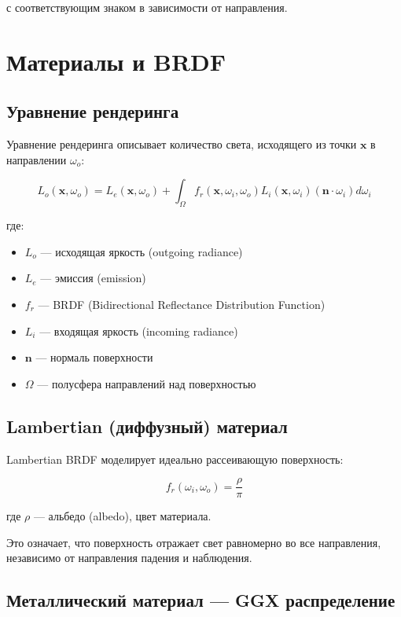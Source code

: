 \documentclass[14pt, a4paper]{extarticle}
\begin{document}
с соответствующим знаком в зависимости от направления.

\section{Материалы и BRDF}

\subsection{Уравнение рендеринга}

Уравнение рендеринга описывает количество света, исходящего из точки $\mathbf{x}$ в направлении $\omega_o$:

\[
L_o(\mathbf{x}, \omega_o) = L_e(\mathbf{x}, \omega_o) + \int_{\Omega} f_r(\mathbf{x}, \omega_i, \omega_o) L_i(\mathbf{x}, \omega_i) (\mathbf{n} \cdot \omega_i) d\omega_i
\]

где:
\begin{itemize}
    \item $L_o$ --- исходящая яркость (outgoing radiance)
    \item $L_e$ --- эмиссия (emission)
    \item $f_r$ --- BRDF (Bidirectional Reflectance Distribution Function)
    \item $L_i$ --- входящая яркость (incoming radiance)
    \item $\mathbf{n}$ --- нормаль поверхности
    \item $\Omega$ --- полусфера направлений над поверхностью
\end{itemize}

\subsection{Lambertian (диффузный) материал}

Lambertian BRDF моделирует идеально рассеивающую поверхность:

\[
f_r(\omega_i, \omega_o) = \frac{\rho}{\pi}
\]

где $\rho$ --- альбедо (albedo), цвет материала.

Это означает, что поверхность отражает свет равномерно во все направления, независимо от направления падения и наблюдения.

\subsection{Металлический материал --- GGX распределение}
\end{document}
